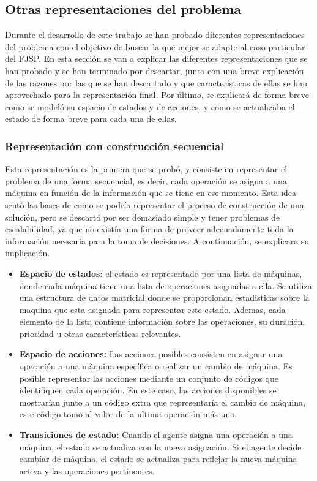 \subsection{Otras representaciones del problema}
Durante el desarrollo de este trabajo se han probado diferentes representaciones
del problema con el objetivo de buscar la que mejor se adapte al caso particular del FJSP. En
esta sección se van a explicar las diferentes representaciones que se han probado
y se han terminado por descartar, junto con una breve explicación de las razones
por las que se han descartado y que características de ellas se han aprovechado
para la representación final. Por último, se explicará de forma breve como se
modeló su espacio de estados y de acciones, y como se actualizaba el estado
de forma breve para cada una de ellas. 

\subsubsection{Representación con construcción secuencial}
Esta representación es la primera que se probó, y consiste en representar el
problema de una forma secuencial, es decir, cada operación se asigna a una máquina
en función de la información que se tiene en ese momento. Esta idea 
sentó las bases de como se podría representar el proceso de construcción de una
solución, pero se descartó por ser demasiado simple y tener problemas de escalabilidad,
ya que no existía una forma de proveer adecuadamente toda la información necesaria
para la toma de decisiones. A continuación, se explicara su implicación.

\begin{itemize}
    \item \textbf{Espacio de estados:} el estado es representado por una 
    lista de máquinas, donde cada máquina tiene una lista de operaciones asignadas
    a ella. Se utiliza una estructura de datos matricial donde se proporcionan estadísticas 
    sobre la maquina que esta asignada para representar este estado. Ademas, cada elemento de la lista 
    contiene información sobre las operaciones, su duración, prioridad u otras características relevantes.
    \item \textbf{Espacio de acciones:} Las acciones posibles consisten en asignar una operación 
    a una máquina específica o realizar un cambio de máquina. Es posible representar las acciones 
    mediante un conjunto de códigos que identifiquen cada operación. En este caso, las acciones
    disponibles se mostrarían junto a un código extra que representaría el cambio de máquina, este código
    tomo al valor de la ultima operación más uno.
    \item \textbf{Transiciones de estado:} Cuando el agente asigna una operación a una máquina, 
    el estado se actualiza con la nueva asignación. Si el agente decide cambiar de máquina, 
    el estado se actualiza para reflejar la nueva máquina activa y las operaciones pertinentes.
\end{itemize}

